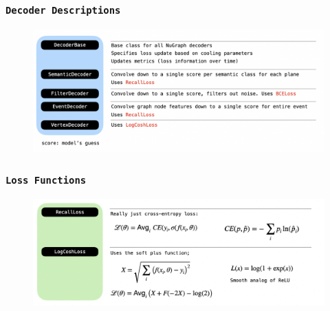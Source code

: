 \documentclass{beamer}
\begin{document}
\begin{frame}
	\frametitle{\texttt{Decoder Descriptions}}
		\begin{figure}[h!]
			\includegraphics[width=1\textwidth]{images/decoders.png}
			\label{decoders}
		\end{figure}
\end{frame}


\begin{frame}
	\frametitle{\texttt{Loss Functions}}
		\begin{figure}[h!]
			\includegraphics[width=1\textwidth]{images/loss.png}
			\label{loss}
		\end{figure}
\end{frame}
\end{document}
